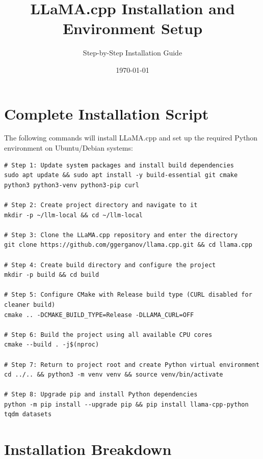 \documentclass[11pt,a4paper]{article}
\begin{document}
\title{\textbf{LLaMA.cpp Installation and Environment Setup}}
\author{Step-by-Step Installation Guide}
\date{\today}

\maketitle

\section{Complete Installation Script}

The following commands will install LLaMA.cpp and set up the required Python environment on Ubuntu/Debian systems:

\begin{lstlisting}[style=terminal]
# Step 1: Update system packages and install build dependencies
sudo apt update && sudo apt install -y build-essential git cmake python3 python3-venv python3-pip curl

# Step 2: Create project directory and navigate to it
mkdir -p ~/llm-local && cd ~/llm-local

# Step 3: Clone the LLaMA.cpp repository and enter the directory
git clone https://github.com/ggerganov/llama.cpp.git && cd llama.cpp

# Step 4: Create build directory and configure the project
mkdir -p build && cd build

# Step 5: Configure CMake with Release build type (CURL disabled for cleaner build)
cmake .. -DCMAKE_BUILD_TYPE=Release -DLLAMA_CURL=OFF

# Step 6: Build the project using all available CPU cores
cmake --build . -j$(nproc)

# Step 7: Return to project root and create Python virtual environment
cd ../.. && python3 -m venv venv && source venv/bin/activate

# Step 8: Upgrade pip and install Python dependencies
python -m pip install --upgrade pip && pip install llama-cpp-python tqdm datasets
\end{lstlisting}

\section{Installation Breakdown}
\end{document}
